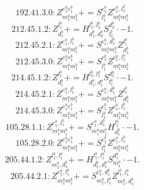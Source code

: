 \documentclass[letterpaper,10pt,fleqn,leqno,onecolumn]{article}
\begin{document}
\begin{equation} \;\;\;\;\;\;  192.41.3.0: Z^{e_{1}^{a}e_{1}^{b}}_{m_{1}^{a}m_{1}^{b}}+=S^{e_{1}^{b}}_{l_{1}^{b}}Z^{e_{1}^{a},l_{1}^{b}}_{m_{1}^{a}m_{1}^{b}} \end{equation}
\begin{equation} \;\;\;\;\;\;  212.45.1.2: Z^{l_{1}^{b}}_{d_{1}^{b}}+=H^{l_{1}^{b},l_{2}^{b}}_{d_{1}^{b},d_{2}^{b}}S^{d_{2}^{b}}_{l_{2}^{b}}\cdot -1. \end{equation}
\begin{equation} \;\;\;\;\;\;  212.45.2.1: Z^{e_{1}^{a},l_{1}^{b}}_{m_{1}^{a}m_{1}^{b}}+=S^{e_{1}^{a},d_{1}^{b}}_{m_{1}^{a}m_{1}^{b}}Z^{l_{1}^{b}}_{d_{1}^{b}} \end{equation}
\begin{equation} \;\;\;\;\;\;  212.45.3.0: Z^{e_{1}^{a}e_{1}^{b}}_{m_{1}^{a}m_{1}^{b}}+=S^{e_{1}^{b}}_{l_{1}^{b}}Z^{e_{1}^{a},l_{1}^{b}}_{m_{1}^{a}m_{1}^{b}} \end{equation}
\begin{equation} \;\;\;\;\;\;  214.45.1.2: Z^{l_{1}^{b}}_{d_{1}^{b}}+=H^{l_{1}^{b},l_{1}^{a}}_{d_{1}^{b},d_{1}^{a}}S^{d_{1}^{a}}_{l_{1}^{a}}\cdot -1. \end{equation}
\begin{equation} \;\;\;\;\;\;  214.45.2.1: Z^{e_{1}^{a},l_{1}^{b}}_{m_{1}^{a}m_{1}^{b}}+=S^{e_{1}^{a},d_{1}^{b}}_{m_{1}^{a}m_{1}^{b}}Z^{l_{1}^{b}}_{d_{1}^{b}} \end{equation}
\begin{equation} \;\;\;\;\;\;  214.45.3.0: Z^{e_{1}^{a}e_{1}^{b}}_{m_{1}^{a}m_{1}^{b}}+=S^{e_{1}^{b}}_{l_{1}^{b}}Z^{e_{1}^{a},l_{1}^{b}}_{m_{1}^{a}m_{1}^{b}} \end{equation}
\begin{equation} \;\;\;\;\;\;  105.28.1.1: Z^{e_{1}^{a},l_{1}^{b}}_{m_{1}^{a}m_{1}^{b}}+=S^{e_{1}^{a},d_{1}^{b}}_{m_{1}^{a}m_{1}^{b}}H^{l_{1}^{b}}_{d_{1}^{b}}\cdot -1. \end{equation}
\begin{equation} \;\;\;\;\;\;  105.28.2.0: Z^{e_{1}^{a}e_{1}^{b}}_{m_{1}^{a}m_{1}^{b}}+=S^{e_{1}^{b}}_{l_{1}^{b}}Z^{e_{1}^{a},l_{1}^{b}}_{m_{1}^{a}m_{1}^{b}} \end{equation}
\begin{equation} \;\;\;\;\;\;  205.44.1.2: Z^{l_{1}^{b},l_{1}^{a}}_{m_{1}^{a},d_{1}^{b}}+=H^{l_{1}^{b},l_{1}^{a}}_{d_{1}^{b},d_{1}^{a}}S^{d_{1}^{a}}_{m_{1}^{a}}\cdot -1. \end{equation}
\begin{equation} \;\;\;\;\;\;  205.44.2.1: Z^{e_{1}^{a},l_{1}^{b}}_{m_{1}^{a}m_{1}^{b}}+=S^{e_{1}^{a},d_{1}^{b}}_{m_{1}^{b},l_{1}^{a}}Z^{l_{1}^{b},l_{1}^{a}}_{m_{1}^{a},d_{1}^{b}} \end{equation}
\end{document}
